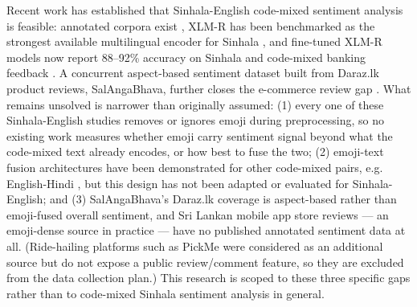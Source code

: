 \documentclass[conference]{IEEEtran}
\begin{document}

Recent work has established that Sinhala-English code-mixed sentiment analysis
is feasible: annotated corpora exist \citep{aththanayaka2020sentimental}, XLM-R
has been benchmarked as the strongest available multilingual encoder for
Sinhala \citep{dhananjaya2022bertifying}, and fine-tuned XLM-R models now
report 88--92\% accuracy on Sinhala and code-mixed banking feedback
\citep{rizvi2025enhancing}. A concurrent aspect-based sentiment dataset built
from Daraz.lk product reviews, SalAngaBhava, further closes the e-commerce
review gap \citep{galwatta2026salangabhava}. What remains unsolved is narrower
than originally assumed: (1) every one of these Sinhala-English studies removes
or ignores emoji during preprocessing, so no existing work measures whether
emoji carry sentiment signal beyond what the code-mixed text already encodes,
or how best to fuse the two; (2) emoji-text fusion architectures have been
demonstrated for other code-mixed pairs, e.g. English-Hindi
\citep{singh2024predicting}, but this design has not been adapted or evaluated
for Sinhala-English; and (3) SalAngaBhava's Daraz.lk coverage is aspect-based
rather than emoji-fused overall sentiment, and Sri Lankan mobile app store
reviews --- an emoji-dense source in practice --- have no published annotated
sentiment data at all. (Ride-hailing platforms such as PickMe were considered
as an additional source but do not expose a public review/comment feature, so
they are excluded from the data collection plan.) This research is scoped to
these three specific gaps rather than to code-mixed Sinhala sentiment analysis
in general.

\end{document}
